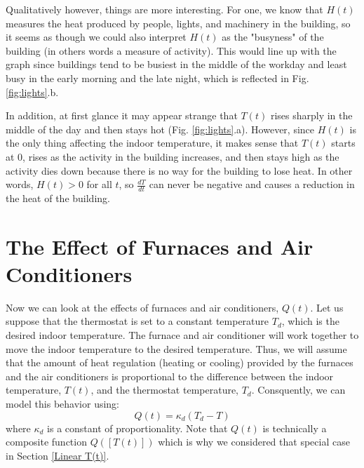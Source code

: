 \documentclass[titlepage]{article}
\begin{document}
Qualitatively however, things are more interesting. For one, we know that $H(t)$ measures the heat produced
by people, lights, and machinery in the building, so it seems as though we could also interpret $H(t)$
as the "busyness" of the building (in others words a measure of activity). This would line up with the graph since
buildings tend to be busiest in the middle of the workday and least busy in the early morning and the late night, 
which is reflected in Fig. \ref{fig:lights}.b.

In addition, at first glance it may appear strange that $T(t)$ rises sharply in the middle of the day and then stays hot (Fig. \ref{fig:lights}.a).
However, since $H(t)$ is the only thing affecting the indoor temperature, it makes sense that $T(t)$ starts at 0, rises as the activity in the building increases, and then 
stays high as the activity dies down because there is no way for the building to lose heat. In other words, $H(t)>0$ for all $t$, 
so $\frac{dT}{dt}$ can never be negative and causes a reduction in the heat of the building.


\section{The Effect of Furnaces and Air Conditioners} \label{furnaces and aircon}
Now we can look at the effects of furnaces and air conditioners, $Q(t)$.
Let us suppose that the thermostat is set to a constant temperature $T_d$, which is the
desired indoor temperature. The furnace and air conditioner will work together to move the indoor temperature 
to the desired temperature. Thus, we will assume that the amount of heat regulation (heating or cooling)
provided by the furnaces and the air conditioners is proportional to the difference between
the indoor temperature, $T(t)$, and the thermostat temperature, $T_d$. Consquently, we can model this behavior using:
\begin{equation}\label{eq:Q(t)}
    Q(t) = \kappa_d(T_d-T)
\end{equation}
where $\kappa_d$ is a constant of proportionality. Note that $Q(t)$ is technically a composite function
$Q([T(t)])$ which is why we considered that special case in Section \ref{Linear T(t)}. 
\end{document}
